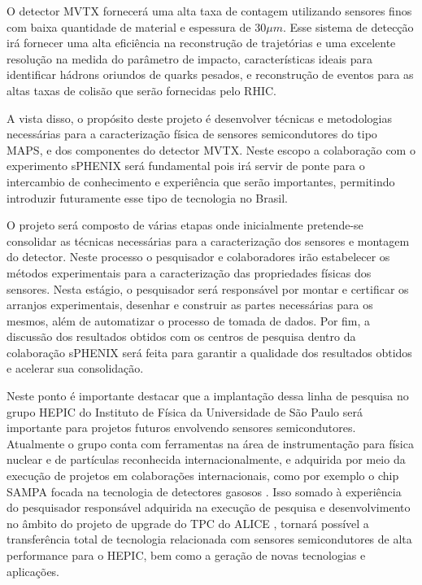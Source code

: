 O detector MVTX fornecerá uma alta taxa de contagem utilizando sensores finos com baixa quantidade de material e espessura de $30\mu m$. Esse sistema de detecção irá fornecer uma alta eficiência na reconstrução de trajetórias e uma excelente resolução na medida do parâmetro de impacto, características ideais para identificar hádrons oriundos de quarks pesados, e reconstrução de eventos para as altas taxas de colisão que serão fornecidas pelo RHIC.

A vista disso, o propósito deste projeto é desenvolver técnicas e metodologias necessárias para a caracterização física de sensores semicondutores do tipo MAPS, e dos componentes do detector MVTX. Neste escopo a colaboração com o experimento sPHENIX será fundamental pois irá servir de ponte para o intercambio de conhecimento e experiência que serão importantes, permitindo introduzir futuramente esse tipo de tecnologia no Brasil.

O projeto será composto de várias etapas onde inicialmente pretende-se consolidar as técnicas necessárias para a caracterização dos sensores e montagem do detector. Neste processo o pesquisador e colaboradores irão estabelecer os 
métodos experimentais para a caracterização das propriedades físicas dos sensores. Nesta estágio, o pesquisador será responsável por montar e certificar os arranjos experimentais, desenhar e construir as partes necessárias para os mesmos, além de automatizar o processo de tomada de dados. Por fim, a discussão dos resultados obtidos com os centros de pesquisa dentro da colaboração sPHENIX será feita para garantir a qualidade dos resultados obtidos e acelerar sua consolidação.

Neste ponto é importante destacar que a implantação dessa linha de pesquisa no grupo HEPIC do Instituto de Física da Universidade de São Paulo será importante para projetos futuros envolvendo sensores semicondutores. Atualmente o grupo conta com ferramentas na área de instrumentação para física nuclear e de partículas reconhecida internacionalmente, e adquirida por meio da execução de projetos em colaborações internacionais, como por exemplo o chip SAMPA focada na tecnologia de detectores gasosos \cite{ref1}. Isso somado à experiência do pesquisador responsável adquirida na execução de pesquisa e desenvolvimento no âmbito do projeto de upgrade do TPC do ALICE \cite{tpcNIM,discharge_paper,GSI_REPO}, tornará possível a transferência total de tecnologia relacionada com sensores semicondutores de alta performance para o HEPIC, bem como a geração de novas tecnologias e aplicações.

\renewcommand{\cleardoublepage}{}
\renewcommand{\clearpage}{}